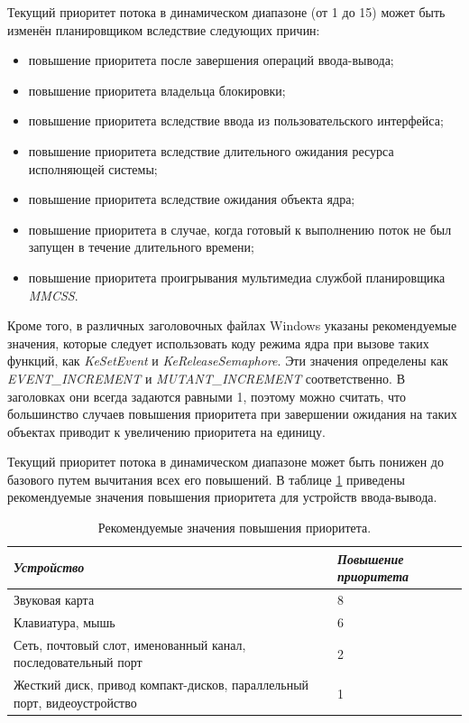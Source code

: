 Текущий приоритет потока в динамическом диапазоне (от 1 до 15) может быть изменён планировщиком вследствие следующих причин:
\begin{itemize}
    \item повышение приоритета после завершения операций ввода-вывода;
    \item повышение приоритета владельца блокировки;
    \item повышение приоритета вследствие ввода из пользовательского интерфейса;
    \item повышение приоритета вследствие длительного ожидания ресурса исполняющей системы;
    \item повышение приоритета вследствие ожидания объекта ядра;
    \item повышение приоритета в случае, когда готовый к выполнению поток не был запущен в течение длительного времени;
    \item повышение приоритета проигрывания мультимедиа службой планировщика \textit{MMCSS}.
\end{itemize}

Кроме того, в различных заголовочных файлах Windows указаны рекомендуемые значения, которые следует использовать коду режима ядра при вызове таких функций, как \textit{KeSetEvent} и \textit{KeReleaseSemaphore}. Эти значения определены как \textit{EVENT\_INCREMENT} и \textit{MUTANT\_INCREMENT} соответственно. В заголовках они всегда задаются равными 1, поэтому можно считать, что большинство случаев повышения приоритета при завершении ожидания на таких объектах приводит к увеличению приоритета на единицу.

Текущий приоритет потока в динамическом диапазоне может быть понижен до базового путем вычитания всех его повышений. В таблице \ref{tab:io} приведены рекомендуемые значения повышения приоритета для устройств ввода-вывода.

\begin{table}[H]
    \caption{Рекомендуемые значения повышения приоритета.}
    \begin{center}
        \begin{tabularx}{\textwidth}{|X|l|}
            \hline
            \textit{Устройство} & \textit{Повышение приоритета} \\
            \hline
            Звуковая карта & 8 \\
            \hline
            Клавиатура, мышь & 6 \\
            \hline
            Сеть, почтовый слот, именованный канал, последовательный порт & 2 \\
            \hline
            Жесткий диск, привод компакт-дисков, параллельный порт, видеоустройство & 1 \\
            \hline
        \end{tabularx}
    \end{center}
    \label{tab:io}
\end{table}

